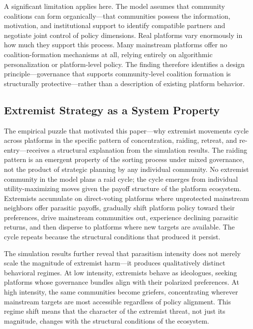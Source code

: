 A significant limitation applies here. The model assumes that community coalitions can form organically---that communities possess the information, motivation, and institutional support to identify compatible partners and negotiate joint control of policy dimensions. Real platforms vary enormously in how much they support this process. Many mainstream platforms offer no coalition-formation mechanisms at all, relying entirely on algorithmic personalization or platform-level policy. The finding therefore identifies a design principle---governance that supports community-level coalition formation is structurally protective---rather than a description of existing platform behavior.

\subsection{Extremist Strategy as a System Property}

The empirical puzzle that motivated this paper---why extremist movements cycle across platforms in the specific pattern of concentration, raiding, retreat, and re-entry---receives a structural explanation from the simulation results. The raiding pattern is an emergent property of the sorting process under mixed governance, not the product of strategic planning by any individual community. No extremist community in the model plans a raid cycle; the cycle emerges from individual utility-maximizing moves given the payoff structure of the platform ecosystem. Extremists accumulate on direct-voting platforms where unprotected mainstream neighbors offer parasitic payoffs, gradually shift platform policy toward their preferences, drive mainstream communities out, experience declining parasitic returns, and then disperse to platforms where new targets are available. The cycle repeats because the structural conditions that produced it persist.

The simulation results further reveal that parasitism intensity does not merely scale the magnitude of extremist harm---it produces qualitatively distinct behavioral regimes. At low intensity, extremists behave as ideologues, seeking platforms whose governance bundles align with their polarized preferences. At high intensity, the same communities become griefers, concentrating wherever mainstream targets are most accessible regardless of policy alignment. This regime shift means that the character of the extremist threat, not just its magnitude, changes with the structural conditions of the ecosystem.

